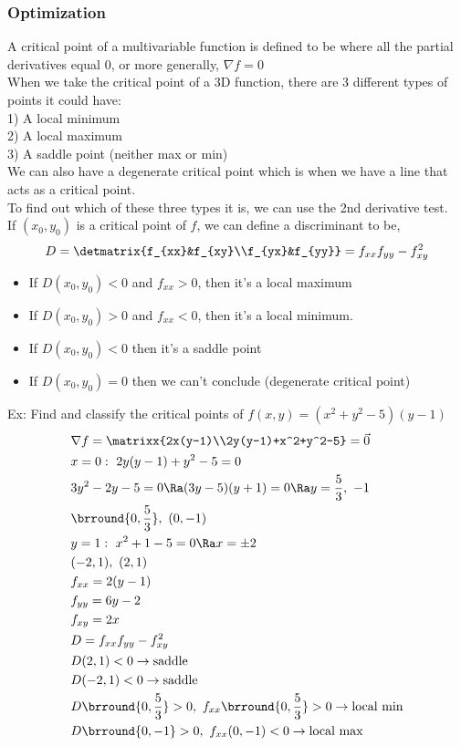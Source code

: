 \subsubsection{Optimization}
A critical point of a multivariable function is defined to be where all the partial derivatives equal 0, or more generally, $\nabla f=0$\\
When we take the critical point of a 3D function, there are 3 different types of points it could have:\\
1) A local minimum\\
2) A local maximum\\
3) A saddle point (neither max or min)\\
We can also have a degenerate critical point which is when we have a line that acts as a critical point.\\
To find out which of these three types it is, we can use the 2nd derivative test.\\
If $(x_0,y_0)$ is a critical point of $f$, we can define a discriminant to be,
$$D=\detmatrix{f_{xx}&f_{xy}\\f_{yx}&f_{yy}}=f_{xx}f_{yy}-f_{xy}^2$$
\begin{itemize}
    \item If $D(x_0,y_0)<0$ and $f_{xx}>0$, then it's a local maximum
    \item If $D(x_0,y_0)>0$ and $f_{xx}<0$, then it's a local minimum.
    \item If $D(x_0,y_0)<0$ then it's a saddle point
    \item If $D(x_0,y_0)=0$ then we can't conclude (degenerate critical point)
\end{itemize}
Ex: Find and classify the critical points of $f(x,y)=(x^2+y^2-5)(y-1)$\\
\begin{align*}
    &\nabla f=\matrixx{2x(y-1)\\2y(y-1)+x^2+y^2-5}=\vec{0}\\
    &x=0:\ 2y(y-1)+y^2-5=0\\
    &3y^2-2y-5=0\Ra (3y-5)(y+1)=0\Ra y=\frac{5}{3},\ -1\\
    &\brround{0,\frac{5}{3}},\ (0,-1)\\
    &y=1:\ x^2+1-5=0\Ra x=\pm2\\
    &(-2,1),\ (2,1)\\
    &f_{xx}=2(y-1)\\
    &f_{yy}=6y-2\\
    &f_{xy}=2x\\
    &D=f_{xx}f_{yy}-f_{xy}^2\\
    &D(2,1)<0\to\text{saddle}\\
    &D(-2,1)<0\to\text{saddle}\\
    &D\brround{0,\frac{5}{3}}>0,\ f_{xx}\brround{0,\frac{5}{3}}>0\to\text{local min}\\
    &D\brround{0,-1}>0,\ f_{xx}(0,-1)<0\to\text{local max}
\end{align*}
